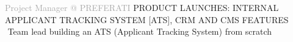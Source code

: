 \begin{cvtable}
%
% 
{\textcolor{darkgray}{%
Project Manager
\newline
@
{P\scriptsize REFERATI}
}}%
{
}%
{%
    {\scriptsize PRODUCT LAUNCHES:
    INTERNAL APPLICANT TRACKING SYSTEM [ATS], %
    CRM AND CMS FEATURES
    } \\
     \textperiodcentered $ $ Team lead building an ATS (Applicant Tracking System) from scratch \\
}
\end{cvtable}
